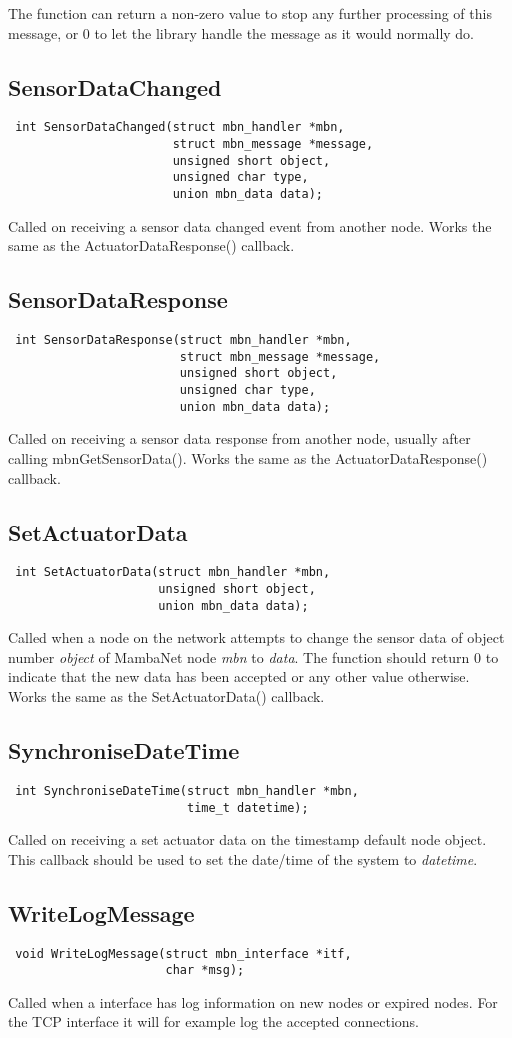 The function can return a non-zero value to stop any further processing of this message, or 0 to let the library handle the message as it would normally do.


\subsection{SensorDataChanged}
\begin{verbatim}
 int SensorDataChanged(struct mbn_handler *mbn,
                       struct mbn_message *message,
                       unsigned short object,
                       unsigned char type,
                       union mbn_data data);
\end{verbatim}
Called on receiving a sensor data changed event from another node. Works the same as the ActuatorDataResponse() callback.


\subsection{SensorDataResponse}
\begin{verbatim}
 int SensorDataResponse(struct mbn_handler *mbn,
                        struct mbn_message *message,
                        unsigned short object,
                        unsigned char type,
                        union mbn_data data);
\end{verbatim}
Called on receiving a sensor data response from another node, usually after calling mbnGetSensorData(). Works the same as the ActuatorDataResponse() callback.


\subsection{SetActuatorData}
\begin{verbatim}
 int SetActuatorData(struct mbn_handler *mbn,
                     unsigned short object,
                     union mbn_data data);
\end{verbatim}
Called when a node on the network attempts to change the sensor data of object number \textit{object} of MambaNet node \textit{mbn} to \textit{data}. The function should return 0 to indicate that the new data has been accepted or any other value otherwise. Works the same as the SetActuatorData() callback.


\subsection{SynchroniseDateTime}
\begin{verbatim}
 int SynchroniseDateTime(struct mbn_handler *mbn,
                         time_t datetime);
\end{verbatim}
Called on receiving a set actuator data on the timestamp default node object. This callback should be used to set the date/time of the system to \textit{datetime}.


\subsection{WriteLogMessage}
\begin{verbatim}
 void WriteLogMessage(struct mbn_interface *itf,
                      char *msg);
\end{verbatim}
Called when a interface has log information on new nodes or expired nodes. For the TCP interface it will for example log the accepted connections.

